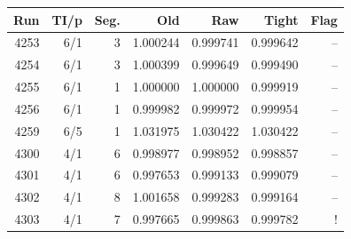 \begin{tabular}{rrrrrrr}\toprule Run & TI/p & Seg. & Old & Raw & Tight & Flag\\\midrule
4253 & 6/1 & 3 & 1.000244 & 0.999741 & 0.999642 & --\\
4254 & 6/1 & 3 & 1.000399 & 0.999649 & 0.999490 & --\\
4255 & 6/1 & 1 & 1.000000 & 1.000000 & 0.999919 & --\\
4256 & 6/1 & 1 & 0.999982 & 0.999972 & 0.999954 & --\\
4259 & 6/5 & 1 & 1.031975 & 1.030422 & 1.030422 & --\\
4300 & 4/1 & 6 & 0.998977 & 0.998952 & 0.998857 & --\\
4301 & 4/1 & 6 & 0.997653 & 0.999133 & 0.999079 & --\\
4302 & 4/1 & 8 & 1.001658 & 0.999283 & 0.999164 & --\\
4303 & 4/1 & 7 & 0.997665 & 0.999863 & 0.999782 & !\\
\bottomrule\end{tabular}